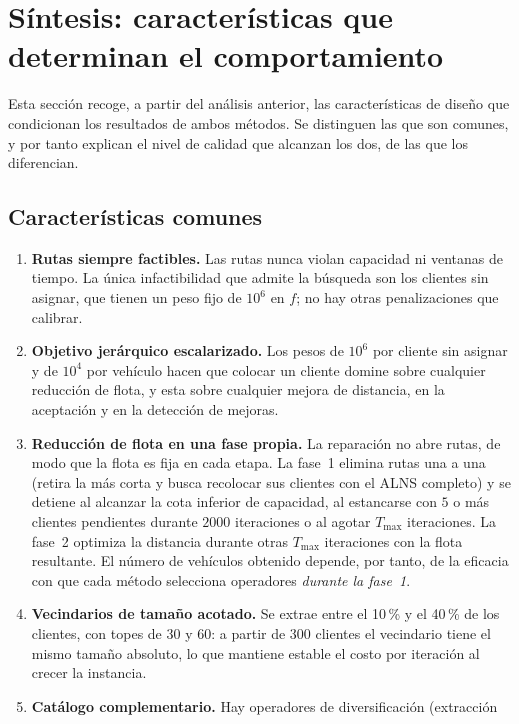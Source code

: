 \section{Síntesis: características que determinan el comportamiento}
\label{sec:sintesis}

Esta sección recoge, a partir del análisis anterior, las características de diseño que
condicionan los resultados de ambos métodos. Se distinguen las que son comunes, y por tanto
explican el nivel de calidad que alcanzan los dos, de las que los diferencian.

\subsection{Características comunes}

\begin{enumerate}
\item \textbf{Rutas siempre factibles.} Las rutas nunca violan capacidad ni ventanas de
tiempo. La única infactibilidad que admite la búsqueda son los clientes sin asignar, que
tienen un peso fijo de $10^6$ en $f$; no hay otras penalizaciones que calibrar.
\item \textbf{Objetivo jerárquico escalarizado.} Los pesos de $10^6$ por cliente sin asignar y
de $10^4$ por vehículo hacen que colocar un cliente domine sobre cualquier reducción de flota,
y esta sobre cualquier mejora de distancia, en la aceptación y en la detección de mejoras.
\item \textbf{Reducción de flota en una fase propia.} La reparación no abre rutas, de modo que
la flota es fija en cada etapa. La fase~1 elimina rutas una a una (retira la más corta y
busca recolocar sus clientes con el ALNS completo) y se detiene al alcanzar la cota inferior
de capacidad, al estancarse con $5$ o más clientes pendientes durante $2000$ iteraciones o al
agotar $T_{\max}$ iteraciones. La fase~2 optimiza la distancia durante otras $T_{\max}$
iteraciones con la flota resultante. El número de vehículos obtenido depende, por tanto, de
la eficacia con que cada método selecciona operadores \emph{durante la fase~1}.
\item \textbf{Vecindarios de tamaño acotado.} Se extrae entre el 10\,\% y el 40\,\% de los
clientes, con topes de $30$ y $60$: a partir de $300$ clientes el vecindario tiene el mismo
tamaño absoluto, lo que mantiene estable el costo por iteración al crecer la instancia.
\item \textbf{Catálogo complementario.} Hay operadores de diversificación (extracción

\end{enumerate}
